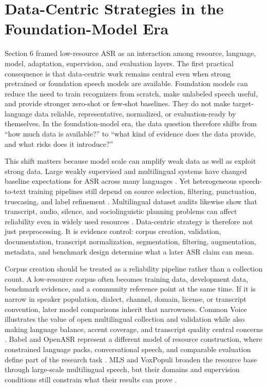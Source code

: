 \documentclass[pdflatex,sn-basic,iicol]{sn-jnl}
\theoremstyle{thmstyleone}
\theoremstyle{thmstyletwo}
\theoremstyle{thmstylethree}
\begin{document}
\section{Data-Centric Strategies in the Foundation-Model Era}

Section 6 framed low-resource ASR as an interaction among resource, language, model, adaptation, supervision, and evaluation layers. The first practical consequence is that data-centric work remains central even when strong pretrained or foundation speech models are available. Foundation models can reduce the need to train recognizers from scratch, make unlabeled speech useful, and provide stronger zero-shot or few-shot baselines. They do not make target-language data reliable, representative, normalized, or evaluation-ready by themselves. In the foundation-model era, the data question therefore shifts from ``how much data is available?'' to ``what kind of evidence does the data provide, and what risks does it introduce?''

This shift matters because model scale can amplify weak data as well as exploit strong data. Large weakly supervised and multilingual systems have changed baseline expectations for ASR across many languages \citep{pmlr-v202-radford23a,pratap2024mms}. Yet heterogeneous speech-to-text training pipelines still depend on source selection, filtering, punctuation, truecasing, and label refinement \citep{tian24_interspeech}. Multilingual dataset audits likewise show that transcript, audio, silence, and sociolinguistic planning problems can affect reliability even in widely used resources \citep{lau2025_data_quality_multilingual_speech}. Data-centric strategy is therefore not just preprocessing. It is evidence control: corpus creation, validation, documentation, transcript normalization, segmentation, filtering, augmentation, metadata, and benchmark design determine what a later ASR claim can mean.

Corpus creation should be treated as a reliability pipeline rather than a collection count. A low-resource corpus often becomes training data, development data, benchmark evidence, and a community reference point at the same time. If it is narrow in speaker population, dialect, channel, domain, license, or transcript convention, later model comparisons inherit that narrowness. Common Voice illustrates the value of open multilingual collection and validation while also making language balance, accent coverage, and transcript quality central concerns \citep{ardila2020commonvoice}. Babel and OpenASR represent a different model of resource construction, where constrained language packs, conversational speech, and comparable evaluation define part of the research task \citep{gales2014_babel_project_research_cued,peterson2022_openasr21}. MLS and VoxPopuli broaden the resource base through large-scale multilingual speech, but their domains and supervision conditions still constrain what their results can prove \citep{pratap20_interspeech,wang2021voxpopuli}.
\end{document}
